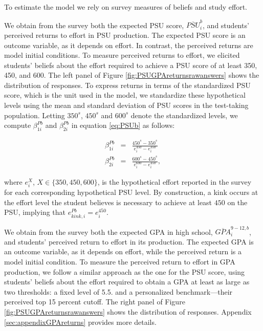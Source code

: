 To estimate the model we rely on survey measures of beliefs and study effort. \par




We obtain from the survey both the expected PSU score, $\overline{PSU}_i^b$, and students' perceived returns to effort in PSU production. The expected PSU score is an outcome variable, as it depends on effort. In contrast, the perceived returns are model initial conditions. To measure perceived returns to effort, we elicited students' beliefs about the effort required to achieve a PSU score of at least 350, 450, and 600. The left panel of Figure \ref{fig:PSUGPAreturnsrawanswers} shows the distribution of responses. To express returns in terms of the standardized PSU score, which is the unit used in the model, we standardize these hypothetical levels using the mean and standard deviation of PSU scores in the test-taking population. Letting $350^s$, $450^s$ and $600^s$ denote the standardized levels, we compute $\beta_{1i}^{Pb}$ and $\beta_{2i}^{Pb}$ in equation \eqref{eq:PSUb} as follows:

\begin{eqnarray}\label{eq:PSUbreturns}
    \beta_{1i}^{Pb}&=&\frac{450^s-350^s}{e_i^{450}-e_i^{350}} \\ \nonumber
    \beta_{2i}^{Pb}&=&\frac{600^s-450^s}{e_i^{600}-e_i^{450}},
\end{eqnarray}

\noindent where $e_i^{X}$, $X\in\{350, 450, 600\}$, is the hypothetical effort reported in the survey for each corresponding hypothetical PSU level. By construction, a kink occurs at the effort level the student believes is necessary to achieve at least $450$ on the PSU, implying that $e_{kink,i}^{Pb}=e_i^{450}$.\par 

We obtain from the survey both the expected GPA in high school, $\overline{GPA}_i^{9-12,b}$, and students' perceived return to effort in its production. The expected GPA is an outcome variable, as it depends on effort, while the perceived return is a model initial condition. To measure the perceived return to effort in GPA production, we follow a similar approach as the one for the PSU score, using students' beliefs about the effort required to obtain a GPA at least as large as two thresholds: a fixed level of 5.5. and a personalized benchmark---their perceived top 15 percent cutoff. The right panel of Figure \ref{fig:PSUGPAreturnsrawanswers} shows the distribution of responses. Appendix \ref{sec:appendixGPAreturns} provides more details.\par 




